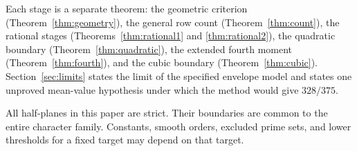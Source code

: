 Each stage is a separate theorem: the geometric criterion (Theorem~\ref{thm:geometry}), the general row count (Theorem~\ref{thm:count}), the rational stages (Theorems~\ref{thm:rational1} and \ref{thm:rational2}), the quadratic boundary (Theorem~\ref{thm:quadratic}), the extended fourth moment (Theorem~\ref{thm:fourth}), and the cubic boundary (Theorem~\ref{thm:cubic}). Section~\ref{sec:limits} states the limit of the specified envelope model and states one unproved mean-value hypothesis under which the method would give $328/375$.

All half-planes in this paper are strict. Their boundaries are common to the entire character family. Constants, smooth orders, excluded prime sets, and lower thresholds for a fixed target may depend on that target.
